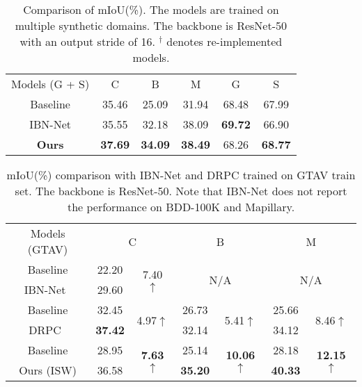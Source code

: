\documentclass[final]{latex/cvpr}
\newcommand{\drule}{\specialrule{0.2pt}{1pt}{1pt}\specialrule{0.2pt}{0pt}{\belowrulesep}}
\begin{document}
\begin{table}[h]
\vspace*{-0.15cm}
\begin{center}
\footnotesize
\begin{tabular}{c|c|c|c||c|c}
\toprule
Models (G + S) & C & B & M & G & S \\
\drule
Baseline & 35.46 & 25.09 & 31.94 & 68.48 & 67.99 \\ 
\midrule
IBN-Net & 35.55 & 32.18 & 38.09 & \textbf{69.72} & 66.90 \\
\midrule
\textbf{Ours} & \textbf{37.69} & \textbf{34.09} & \textbf{38.49} & 68.26 & \textbf{68.77} \\
\bottomrule
\end{tabular}
\end{center}
\vspace*{-0.1cm}
\caption{Comparison of mIoU(\%). The models are trained on multiple synthetic domains. The backbone is ResNet-50 with an output stride of 16. $^\dagger$ denotes re-implemented models.}
\label{tab_multi_source_best}
\vspace*{-0.5cm}
\end{table}




\begin{table}[b!]
\vspace*{-0.0cm}
\begin{center}
\setlength\tabcolsep{4.2pt}
\footnotesize
\begin{tabular}{c|cc|cc|cc}
\toprule
Models (GTAV) & \multicolumn{2}{c|}{C} & \multicolumn{2}{c|}{B} & \multicolumn{2}{c}{M} \\
\drule
Baseline & 22.20   & \multirow{2}{*}{7.40 $\uparrow$} & \multicolumn{2}{c|}{\multirow{2}{*}{N/A}}  & \multicolumn{2}{c}{\multirow{2}{*}{N/A}} \\ 
IBN-Net~\cite{pan2018two} & 29.60   & & & &  & \\ 
\midrule
Baseline          & 32.45 & \multirow{2}{*}{4.97$\uparrow$} & 26.73 & \multirow{2}{*}{5.41$\uparrow$} & 25.66 & \multirow{2}{*}{8.46$\uparrow$} \\ 
DRPC~\cite{yue2019domain} & \textbf{37.42} & & 32.14 &  & 34.12 &     \\ 
\midrule
Baseline & 28.95 & \multirow{2}{*}{\textbf{7.63}$\uparrow$} & 25.14 & \multirow{2}{*}{\textbf{10.06}$\uparrow$} & 28.18  & \multirow{2}{*}{\textbf{12.15}$\uparrow$}  \\ 
Ours (ISW)   & 36.58 & & \textbf{35.20} &  & \textbf{40.33} & \\ 
\bottomrule
\end{tabular}
\end{center}
\vspace*{-0.15cm}
\caption{mIoU(\%) comparison with IBN-Net and DRPC trained on GTAV train set. The backbone is ResNet-50. Note that IBN-Net does not report the performance on BDD-100K and Mapillary.}
\label{tab_best_model_8}
\vspace*{-0.2cm}
\end{table}
\end{document}
